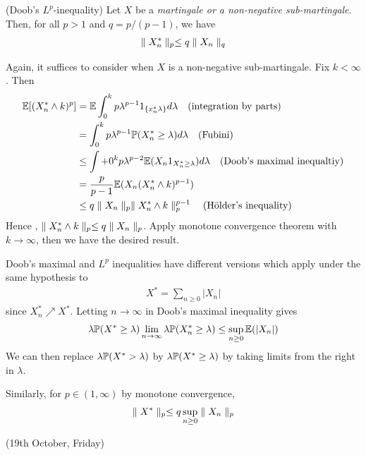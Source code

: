 \documentclass[10pt,a4paper]{report}
\newenvironment{proof}
{\begin{changemargin}{1cm}{0.5cm} 
	}%
	{\end{changemargin}
}
\begin{document}
 (Doob's $L^p$-inequality) Let $X$ be a \emph{martingale or a non-negative sub-martingale}. Then, for all $p>1$ and $q = p/(p-1)$, we have
\begin{align*}
\parallel X^*_n \parallel_{p} \leq q \parallel X_n \parallel_{q} 
\end{align*}
\begin{proof}
\pf Again, it suffices to consider when $X$ is a non-negative sub-martingale. Fix $k < \infty$. Then
\begin{align*}
\mathbb{E} [ (X^*_n \wedge k)^p  ] &= \mathbb{E} \int_0^k p \lambda^{p-1} 1_{\{x^*_n \lambda \}} d\lambda \quad \text{(integration by parts)}\\
& = \int_0^k p \lambda^{p-1} \mathbb{P}(X^*_n \geq \lambda) d\lambda \quad \text{(Fubini)} \\
& \leq \int+0^k p\lambda^{p-2} \mathbb{E} (X_n 1_{X^*_n \geq \lambda}) d\lambda \quad \text{(Doob's maximal inequaltiy)} \\
& =\frac{p}{p-1} \mathbb{E}(X_n (X^*_n \wedge k)^{p-1} ) \\
& \leq q \parallel X_n \parallel_{p} \parallel X^*_n \wedge k \parallel_{p}^{p-1} \quad \text{(H\"{o}lder's inequality)}
\end{align*}
Hence , $\parallel X^*_n \wedge k \parallel_{p} \leq q\parallel X_n \parallel_{p}$. Apply monotone convergence theorem with $k\rightarrow \infty$, then we have the desired result.

\eop
\end{proof}
\s

Doob's maximal and $L^p$ inequalities have different versions which apply under the same hypothesis to
\begin{align*}
X^* = \sum_{n\geq 0} |X_n|
\end{align*}
since $X^*_n \nearrow X^*$. Letting $n\rightarrow \infty$ in Doob's maximal inequality gives
\begin{align*}
\lambda \mathbb{P}(X^* \geq \lambda) \lim_{n\rightarrow \infty} \lambda \mathbb{P}(X^*_n \geq \lambda) \leq \sup_{n\geq 0} \mathbb{E}(|X_n|)
\end{align*}
We can then replace $\lambda \mathbb{P}(X^* >\lambda)$ by $\lambda \mathbb{P} (X^* \geq \lambda)$ by taking limits from the right in $\lambda$.

\quad Similarly, for $p\in (1,\infty)$ by monotone convergence,
\begin{align*}
\parallel X^* \parallel_{p} \leq q \sup_{n\geq 0} \parallel X_n \parallel_{p}
\end{align*}
\s

\newday

(19th October, Friday)
\s
\end{document}
